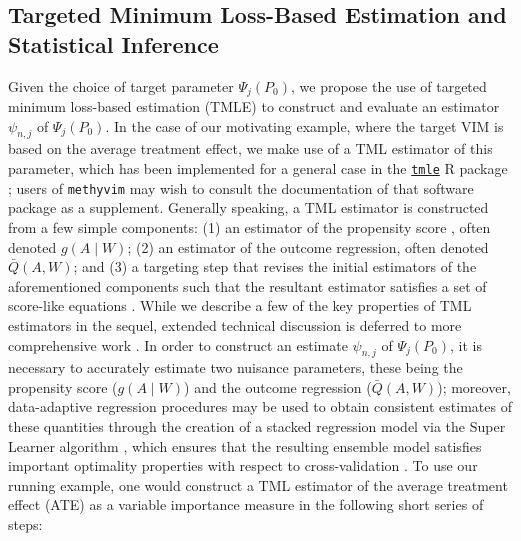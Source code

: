 \documentclass[9pt,a4paper,]{extarticle}
\theoremstyle{definition}
\theoremstyle{definition}
\theoremstyle{definition}
\theoremstyle{remark}
\begin{document}
\hypertarget{targeted-minimum-loss-based-estimation-and-statistical-inference}{%
\subsection{Targeted Minimum Loss-Based Estimation and Statistical Inference}\label{targeted-minimum-loss-based-estimation-and-statistical-inference}}

Given the choice of target parameter \(\Psi_j(P_0)\), we propose the use of
targeted minimum loss-based estimation (TMLE) to construct and evaluate an
estimator \(\psi_{n, j}\) of \(\Psi_j(P_0)\). In the case of our motivating example,
where the target VIM is based on the average treatment effect, we make use of a
TML estimator of this parameter, which has been implemented for a general case
in the \href{https://CRAN.R-project.org/package=tmle}{\texttt{tmle}} R package
\citep{gruber2011tmle}; users of \texttt{methyvim} may wish to consult the documentation of
that software package as a supplement. Generally speaking, a TML estimator is
constructed from a few simple components: (1) an estimator of the propensity
score \citep{rosenbaum1983central}, often denoted \(g(A \mid W)\); (2) an estimator of
the outcome regression, often denoted \(\bar{Q}(A, W)\); and (3) a targeting step
that revises the initial estimators of the aforementioned components such that
the resultant estimator satisfies a set of score-like equations
\citep{gruber2009targeted}. While we describe a few of the key properties of TML
estimators in the sequel, extended technical discussion is deferred to more
comprehensive work \citep[\citet{vdl2018targeted}]{vdl2011targeted}. In order to construct
an estimate \(\psi_{n, j}\) of \(\Psi_j(P_0)\), it is necessary to accurately
estimate two nuisance parameters, these being the propensity score
(\(g(A \mid W)\)) and the outcome regression (\(\bar{Q}(A, W)\)); moreover,
data-adaptive regression procedures may be used to obtain consistent estimates
of these quantities through the creation of a stacked regression model via the
Super Learner algorithm \citep[\citet{breiman1996stacked},
\citet{vdl2007super}]{wolpert1992stacked}, which ensures that the resulting ensemble model satisfies
important optimality properties with respect to cross-validation
\citep[\citet{dudoit2005asymptotics}, \citet{vdl2003unified}]{vdl2004asymptotic}. To use our
running example, one would construct a TML estimator of the average treatment
effect (ATE) as a variable importance measure in the following short series of
steps:
\end{document}
